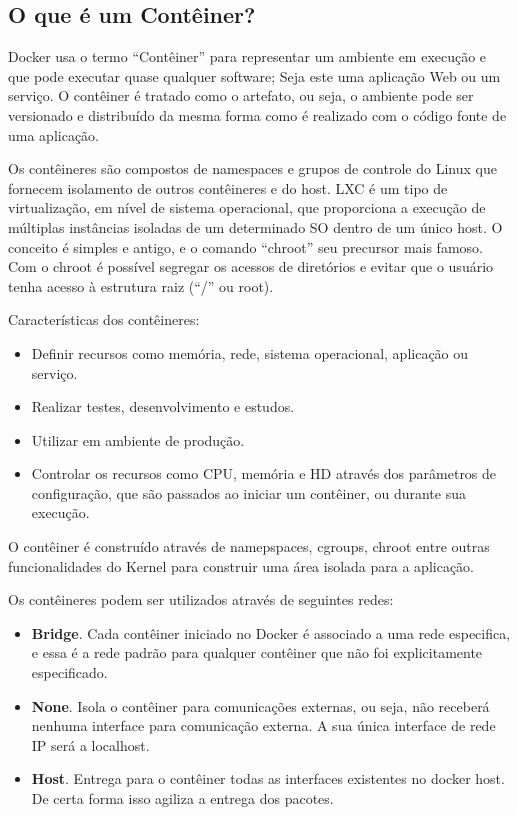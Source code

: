 \documentclass[a4paper,11pt]{article}
\begin{document}
\subsection{O que é um Contêiner?}
Docker usa o termo ``Contêiner'' para representar um ambiente em execução e que pode executar quase qualquer software; Seja este uma aplicação Web ou um serviço. O contêiner é tratado como o artefato, ou seja, o ambiente pode ser versionado e distribuído da mesma forma como é realizado com o código fonte de uma aplicação. 

Os contêineres são compostos de namespaces e grupos de controle do Linux que fornecem isolamento de outros contêineres e do host. LXC é um tipo de virtualização, em nível de sistema operacional, que proporciona a execução de múltiplas instâncias isoladas de um determinado SO dentro de um único host. O conceito é simples e antigo, e o comando ``chroot'' seu precursor mais famoso. Com o chroot é possível segregar os acessos de diretórios e evitar que o usuário tenha acesso à estrutura raiz (“/” ou root).

Características dos contêineres:
\begin{itemize}
  \item Definir recursos como memória, rede, sistema operacional, 
aplicação ou serviço. 
  \item Realizar testes, desenvolvimento e estudos.
  \item Utilizar em ambiente de produção.
  \item Controlar os recursos como CPU, memória e HD através dos parâmetros 
de configuração, que são passados ao iniciar um contêiner, ou durante sua 
execução.
\end{itemize}
O contêiner é construído através de namepspaces, cgroups, chroot entre outras 
funcionalidades do Kernel para construir uma área isolada para a aplicação.

Os contêineres podem ser utilizados através de seguintes redes:
\begin{itemize}
  \item \textbf{Bridge}. Cada contêiner iniciado no Docker é associado a uma rede especifica, e essa é a rede padrão para qualquer contêiner que não foi explicitamente especificado.
  \item \textbf{None}. Isola o contêiner para comunicações externas, ou seja, não receberá nenhuma interface para comunicação externa. A sua única interface de rede IP será a localhost.
  \item \textbf{Host}. Entrega para o contêiner todas as interfaces existentes no docker host. De certa forma isso agiliza a entrega dos pacotes.
\end{itemize}
\end{document}
